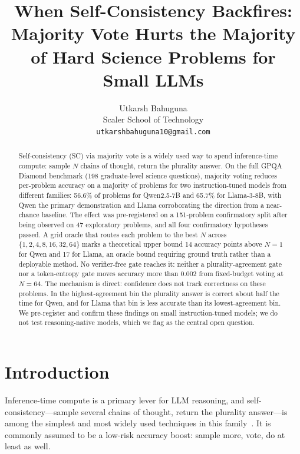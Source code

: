\documentclass{article}
\title{When Self-Consistency Backfires: Majority Vote Hurts the Majority of Hard Science Problems for Small LLMs}
\author{Utkarsh Bahuguna \\
Scaler School of Technology \\
\texttt{utkarshbahuguna10@gmail.com}}
\begin{document}
\ifcolmsubmission
\linenumbers
\fi

\maketitle


\begin{abstract}
Self-consistency (SC) via majority vote is a widely used way to spend
inference-time compute: sample $N$ chains of thought, return the plurality
answer. On the full GPQA Diamond benchmark (198 graduate-level science
questions), majority voting reduces per-problem accuracy on a majority of
problems for two instruction-tuned models from different families: 56.6\% of
problems for Qwen2.5-7B and 65.7\% for Llama-3-8B, with Qwen the primary
demonstration and Llama corroborating the direction from a near-chance
baseline. The effect was
pre-registered on a 151-problem confirmatory split after being observed on
47 exploratory problems, and all four confirmatory hypotheses passed. A grid
oracle that routes each problem to the best $N$ across $\{1,2,4,8,16,32,64\}$
marks a theoretical upper bound 14 accuracy points above $N=1$ for Qwen and
17 for Llama, an oracle bound requiring ground truth rather than a deployable
method. No verifier-free gate reaches it: neither a plurality-agreement gate
nor a token-entropy gate moves accuracy more than 0.002 from fixed-budget
voting at $N=64$. The mechanism is direct:
confidence does not track correctness on these problems. In the
highest-agreement bin the plurality answer is correct about half the time for
Qwen, and for Llama that bin is less accurate than its lowest-agreement
bin. We
pre-register and confirm these findings on small instruction-tuned models; we
do not test reasoning-native models, which we flag as the central open
question.
\end{abstract}

\section{Introduction}

Inference-time compute is a primary lever for LLM reasoning, and
self-consistency---sample several chains of thought, return the plurality
answer---is among the simplest and most widely used techniques in this
family~\citep{wang2023self}. It is commonly assumed to be a low-risk
accuracy boost: sample more, vote, do at least as well.
\end{document}
